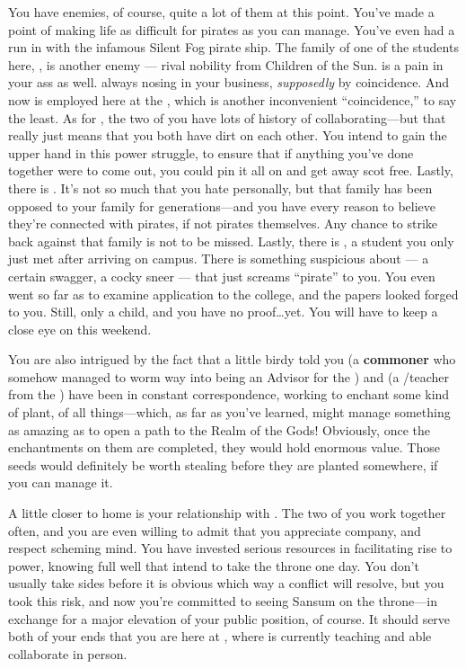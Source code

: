 \documentclass[char]{GL2020}
\begin{document}
You have enemies, of course, quite a lot of them at this point. You've made a point of making life as difficult for pirates as you can manage. You've even had a run in with the infamous Silent Fog pirate ship. The family of one of the students here, \cChupStudent{\full}, is another enemy — rival nobility from Children of the Sun. \cInterpol{\full} is a pain in your ass as well. \cInterpol{\Theyare} always nosing in your business, \emph{supposedly} by coincidence. And now \cInterpol{} is employed here at the \pSc{}, which is another inconvenient ``coincidence,'' to say the least. As for \cDiplomat{}, the two of you have lots of history of collaborating---but that really just means that you both have dirt on each other. You intend to gain the upper hand in this power struggle, to ensure that if anything you've done together were to come out, you could pin it all on \cDiplomat{} and get away scot free. Lastly, there is \cJuniorStatesman{\full}. It's not so much that you hate \cJuniorStatesman{} personally, but that \cJuniorStatesman{\their} family has been opposed to your family for generations---and you have every reason to believe they're connected with pirates, if not pirates themselves. Any chance to strike back against that family is not to be missed. Lastly, there is \cPirateChild{\full}, a student you only just met after arriving on campus. There is something suspicious about \cPirateChild{\them} — a certain swagger, a cocky sneer — that just screams ``pirate'' to you. You even went so far as to examine  \cPirateChild{\their} application to the college, and the papers looked forged to you. Still, \cPirateChild{\theyare} only a child, and you have no proof\ldots{}yet. You will have to keep a close eye on \cPirateChild{\them} this weekend.

You are also intrigued by the fact that a little birdy told you \cCurse{\full} (a \textbf{commoner} who somehow managed to worm \cCurse{\their} way into being an Advisor for the \pFarm{}) and \cFlowPriest{\full} (a \cFlowPriest{\cleric}/teacher from the \pShip{}) have been in constant correspondence, working to enchant some kind of plant, of all things---which, as far as you've learned, might manage something as amazing as to open a path to the Realm of the Gods! Obviously, once the enchantments on them are completed, they would hold enormous value. Those seeds would definitely be worth stealing before they are planted somewhere, if you can manage it.

A little closer to home is your relationship with \cPrince{\full}. The two of you work together often, and you are even willing to admit that you appreciate \cPrince{\their} company, and respect \cPrince{\their} scheming mind. You have invested serious resources in facilitating \cPrince{\their} rise to power, knowing full well that \cPrince{\they} intend\cPrince{\plural} to take the throne one day. You don't usually take sides before it is obvious which way a conflict will resolve, but you took this risk, and now you're committed to seeing Sansum on the throne---in exchange for a major elevation of your public position, of course. It should serve both of your ends that you are here at \pSchool{}, where \cPrince{} is currently teaching and able collaborate in person. 
\end{document}
